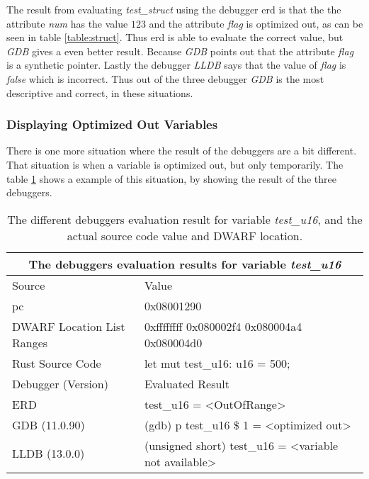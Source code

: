 The result from evaluating \emph{test\_struct} using the debugger \gls{erd} is that the the attribute \emph{num} has the value $123$ and the attribute \emph{flag} is optimized out, as can be seen in table \ref{table:struct}.
Thus \gls{erd} is able to evaluate the correct value, but \emph{GDB} gives a even better result.
Because \emph{GDB} points out that the attribute \emph{flag} is a synthetic pointer.
Lastly the debugger \emph{LLDB} says that the value of \emph{flag} is \emph{false} which is incorrect.
Thus out of the three debugger \emph{GDB} is the most descriptive and correct, in these situations.



\subsubsection{Displaying Optimized Out Variables}
There is one more situation where the result of the debuggers are a bit different.
That situation is when a variable is optimized out, but only temporarily.
The table \ref{table:u16} shows a example of this situation, by showing the result of the three debuggers.


\begin{table}[h]
	\centering
	\small
	\begin{tabular}{ |p{2cm}|p{8cm}|  }
		\hline
		\multicolumn{2}{|c|}{\textbf{The debuggers evaluation results for variable \emph{test\_u16}}} \\ 
		\hline
		\hline
		Source & Value \\
		\hline
		\acrfull{pc} & 0x08001290 \\

		DWARF Location List Ranges & 0xffffffff 	0x080002f4\newline
    					     0x080004a4 	0x080004d0\\

		Rust Source Code & let mut test\_u16: u16 = 500; \\
		\hline
		\hline
		Debugger (Version) & Evaluated Result \\
		\hline
		ERD & test\_u16 = \textless OutOfRange\textgreater \\

		GDB (11.0.90)  & (gdb) p test\_u16\newline
		\$ 1 = \textless optimized out\textgreater \\

		LLDB (13.0.0) & (unsigned short) test\_u16 = \textless variable not available\textgreater \\
		\hline
	\end{tabular}
	\label{table:u16}
	\caption{The different debuggers evaluation result for variable \emph{test\_u16}, and the actual source code value and DWARF location.}
\end{table}


